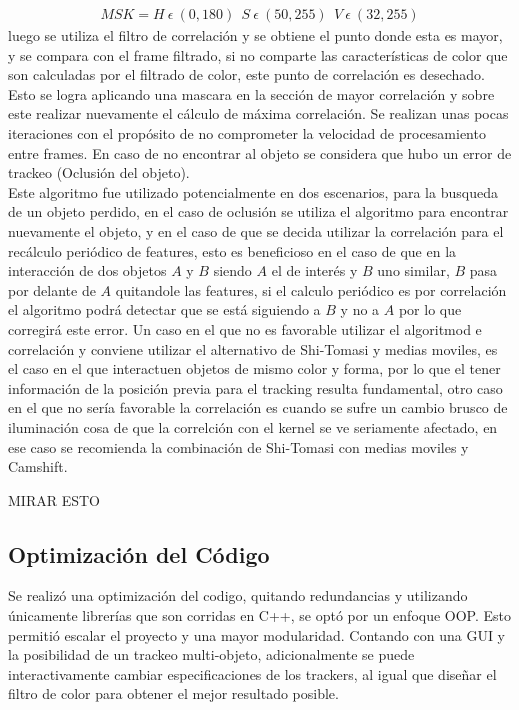 \begin{itemize}
\begin{align}
MSK = H \  \epsilon \ (0,180 ) \ \ S \  \epsilon \ (50,255) \ \ V \ \epsilon \ (32,255)
\end{align}
luego se utiliza el filtro de correlación y se obtiene el punto donde esta es mayor, y se compara con el frame filtrado, si no comparte las características de color que son calculadas por el filtrado de color, este punto de correlación es desechado. Esto se logra aplicando una mascara en la sección de mayor correlación y sobre este realizar nuevamente el cálculo de máxima correlación. Se realizan unas pocas iteraciones con el propósito de no comprometer la velocidad de procesamiento entre frames. En caso de no encontrar al objeto se considera que hubo un error de trackeo (Oclusión del objeto).\\
Este algoritmo fue utilizado potencialmente en dos escenarios, para la busqueda de un objeto perdido, en el caso de oclusión se  utiliza el algoritmo para encontrar nuevamente el objeto, y en el caso de que se decida utilizar la correlación para el recálculo periódico de features, esto es beneficioso en el caso de que en la interacción de dos objetos $A$ y $B$ siendo $A$ el de interés y $B$ uno similar, $B$ pasa por delante de $A$ quitandole las features, si el calculo periódico es por correlación el algoritmo podrá detectar que se está siguiendo a $B$ y no a $A$ por lo que corregirá este error. Un caso en el que no es favorable utilizar el algoritmod e correlación y conviene utilizar el alternativo de Shi-Tomasi y medias moviles, es el caso en el que interactuen objetos de mismo color y forma, por lo que el tener información de la posición previa para el tracking resulta fundamental, otro caso en el que no sería favorable la correlación es cuando se sufre un cambio brusco de iluminación cosa de que la correlción con el kernel se ve seriamente afectado, en ese caso se recomienda la combinación de Shi-Tomasi con medias moviles y Camshift. 
\begin{Huge}
MIRAR ESTO
\end{Huge}

\subsection{Optimización del Código}
Se realizó una optimización del codigo, quitando redundancias y utilizando únicamente librerías que son corridas en C++, se optó por un enfoque OOP. Esto permitió escalar el proyecto y una mayor modularidad. Contando con una GUI y la posibilidad de un trackeo multi-objeto, adicionalmente se puede interactivamente cambiar especificaciones de los trackers, al igual que diseñar el filtro de color para obtener el mejor resultado posible.



\end{itemize}
